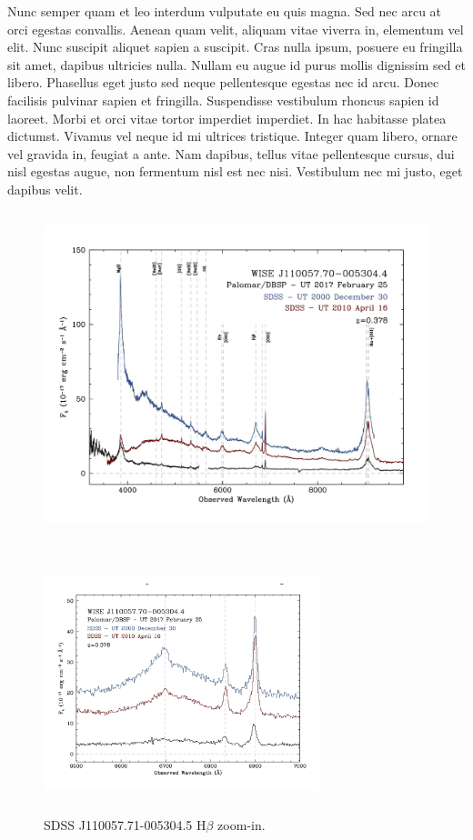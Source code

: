 \documentclass{emulateapj}
\begin{document}
Nunc semper quam et leo interdum vulputate eu quis magna. Sed nec arcu
at orci egestas convallis. Aenean quam velit, aliquam vitae viverra
in, elementum vel elit. Nunc suscipit aliquet sapien a suscipit. Cras
nulla ipsum, posuere eu fringilla sit amet, dapibus ultricies
nulla. Nullam eu augue id purus mollis dignissim sed et
libero. Phasellus eget justo sed neque pellentesque egestas nec id
arcu. Donec facilisis pulvinar sapien et fringilla. Suspendisse
vestibulum rhoncus sapien id laoreet. Morbi et orci vitae tortor
imperdiet imperdiet. In hac habitasse platea dictumst. Vivamus vel
neque id mi ultrices tristique. Integer quam libero, ornare vel
gravida in, feugiat a ante. Nam dapibus, tellus vitae pellentesque
cursus, dui nisl egestas augue, non fermentum nisl est nec
nisi. Vestibulum nec mi justo, eget dapibus velit.
\begin{figure}
  \includegraphics[width=17.00cm, height=9.50cm, trim=0.0cm 0.0cm 0.0cm 0.0cm, clip]
  {../plots/spectra/w1100m0052_sdss.jpg}
  \centering
  \caption[]{  } 
\label{fig:w1100m0052_sdss}
\end{figure}

\begin{figure}
  \includegraphics[width=8.00cm, height=7.50cm, trim=0.0cm 0.0cm 0.0cm 0.0cm, clip]
  {../plots/spectra/w1100m0052_hbeta.jpg}
  \centering
  \caption[]{SDSS J110057.71-005304.5 H$\beta$ zoom-in.}
 \label{fig:w1100m0052_hbeta}
\end{figure}
\end{document}
